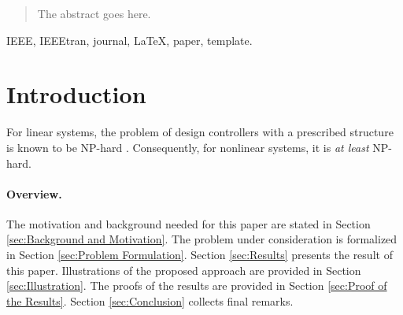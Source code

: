 \documentclass[10pt,twocolumn,twoside]{IEEEtran}
\theoremstyle{plain}
\theoremstyle{definition}
\theoremstyle{remark}
\begin{document}
\maketitle

\begin{abstract}
The abstract goes here.
\end{abstract}

\begin{IEEEkeywords}
IEEE, IEEEtran, journal, \LaTeX, paper, template.
\end{IEEEkeywords}






%
\IEEEpeerreviewmaketitle



\section{Introduction}

For linear systems, the problem of design controllers with a prescribed structure is known to be NP-hard \cite{BlondelTsitsiklis1997}. Consequently, for nonlinear systems, it is \emph{at least} NP-hard.

\paragraph{Overview.} The motivation and background needed for this paper are stated in Section \ref{sec:Background and Motivation}. The problem under consideration is formalized in Section \ref{sec:Problem Formulation}. Section \ref{sec:Results} presents the result of this paper. Illustrations of the proposed approach are provided in Section \ref{sec:Illustration}. The proofs of the results are provided in Section \ref{sec:Proof of the Results}. Section \ref{sec:Conclusion} collects final remarks.
\end{document}
